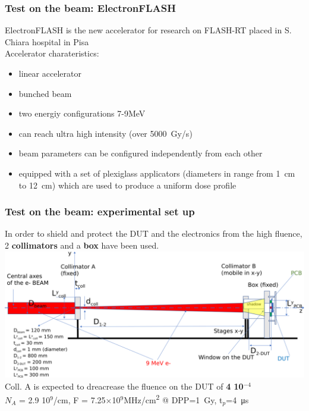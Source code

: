     \begin{frame}
        \frametitle{Test on the beam: ElectronFLASH}
        ElectronFLASH is the new accelerator for research on FLASH-RT placed in S. Chiara hospital in Pisa \\
        \medskip
        Accelerator charateristics: 
        \begin{itemize}
            \item linear accelerator
            \item bunched beam
            \item two energiy configurations 7-9\si{MeV}
            \item can reach ultra high intensity (over \SI{5000}{Gy/s})
            \item beam parameters can be configured independently from each other
            \item equipped with a set of plexiglass applicators (diameters in range from \SI{1}{cm} to \SI{12}{cm}) which are used to produce a uniform dose profile 
        \end{itemize}
    \end{frame}  

    \begin{frame}
        \frametitle{Test on the beam: experimental set up}
        In order to shield and protect the DUT and the electronics from the high fluence, 2 \textbf{collimators} and a \textbf{box} have been used. 
        \smallskip
        \includegraphics[width=.95\linewidth]{figures/test_beam/Flash-beam-scheme.pdf}\\
        \smallskip
        Coll. A is expected to dreacrease the fluence on the DUT of \textbf{4 10$^{-4}$}\\
        \medskip
        $N_A$ = 2.9 10$^9$/cm, F = 7.25$\times$10$^{9}$\si{MHz/cm\squared} @  DPP=\SI{1}{Gy}, t$_p$=\SI{4}{\us}
        
    \end{frame}    


